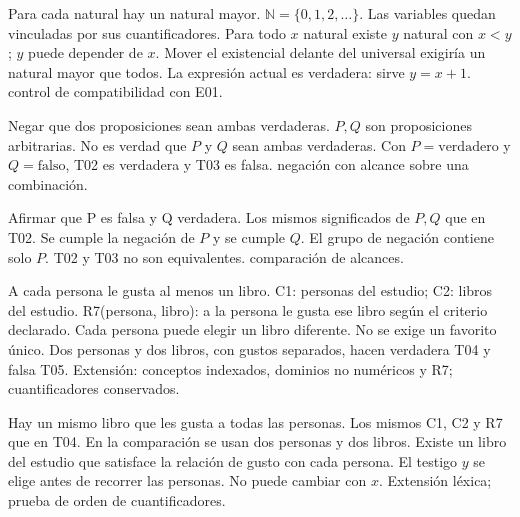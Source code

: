 {Para cada natural hay un natural mayor.}
 {}
 {\(\mathbb N=\{0,1,2,\ldots\}\). Las variables quedan vinculadas por sus cuantificadores.}
 {Para todo \(x\) natural existe \(y\) natural con \(x<y\); \(y\) puede depender de \(x\).}
 {Mover el existencial delante del universal exigiría un natural mayor que todos. La expresión actual es verdadera: sirve \(y=x+1\).}
 {control de compatibilidad con E01.}

 {Negar que dos proposiciones sean ambas verdaderas.}
 {}
 {\(P,Q\) son proposiciones arbitrarias.}
 {No es verdad que \(P\) y \(Q\) sean ambas verdaderas.}
 {Con \(P=\text{verdadero}\) y \(Q=\text{falso}\), T02 es verdadera y T03 es falsa.}
 {negación con alcance sobre una combinación.}

 {Afirmar que P es falsa y Q verdadera.}
 {}
 {Los mismos significados de \(P,Q\) que en T02.}
 {Se cumple la negación de \(P\) y se cumple \(Q\).}
 {El grupo de negación contiene solo \(P\). T02 y T03 no son equivalentes.}
 {comparación de alcances.}

 {A cada persona le gusta al menos un libro.}
 {}
 {C1: personas del estudio; C2: libros del estudio. R7(persona, libro): a la persona le gusta ese libro según el criterio declarado.}
 {Cada persona puede elegir un libro diferente. No se exige un favorito único.}
 {Dos personas y dos libros, con gustos separados, hacen verdadera T04 y falsa T05.}
 {Extensión: conceptos indexados, dominios no numéricos y R7; cuantificadores conservados.}

 {Hay un mismo libro que les gusta a todas las personas.}
 {}
 {Los mismos C1, C2 y R7 que en T04. En la comparación se usan dos personas y dos libros.}
 {Existe un libro del estudio que satisface la relación de gusto con cada persona.}
 {El testigo \(y\) se elige antes de recorrer las personas. No puede cambiar con \(x\).}
 {Extensión léxica; prueba de orden de cuantificadores.}

